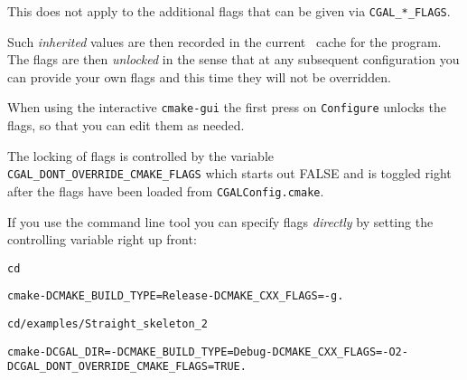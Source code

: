 This does not apply to the additional flags that can be given via \texttt{CGAL\_*\_FLAGS}.

Such \emph{inherited} values are then recorded in the current \cmake\ cache for the program.
The flags are then \emph{unlocked} in the sense that at any subsequent configuration you can
provide your own flags and this time they will not be overridden.

When using the interactive \texttt{cmake-gui} the first press on \texttt{Configure} unlocks
the flags, so that you can edit them as needed. 

\begin{ccAdvanced}
The locking of flags is controlled by the variable {\tt CGAL\_DONT\_OVERRIDE\_CMAKE\_FLAGS}
which starts out FALSE and is toggled right after the flags have been loaded from
\texttt{CGALConfig.cmake}.

If you use the command line tool you can specify flags \emph{directly} by setting the
controlling variable right up front:

{\ccTexHtml{}{}
\begin{alltt}

cd \cgalrel

cmake -DCMAKE_BUILD_TYPE=Release -DCMAKE_CXX_FLAGS=-g .

cd \cgalrel/examples/Straight_skeleton_2

cmake -DCGAL_DIR=\cgalrel -DCMAKE_BUILD_TYPE=Debug -DCMAKE_CXX_FLAGS=-O2 -DCGAL_DONT_OVERRIDE_CMAKE_FLAGS=TRUE . 

\end{alltt}
}
\end{ccAdvanced}






